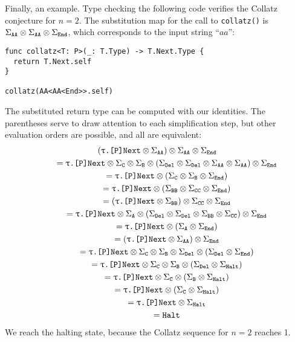 \documentclass[../generics]{subfiles}
\begin{document}
Finally, an example. Type checking the following code verifies the Collatz conjecture for $n=2$. The substitution map for the call to \texttt{collatz()} is $\Sigma_{\texttt{AA}}\otimes\Sigma_{\texttt{AA}}\otimes\Sigma_{\texttt{End}}$, which corresponds to the input string ``$aa$'':
\begin{Verbatim}
func collatz<T: P>(_: T.Type) -> T.Next.Type {
  return T.Next.self
}

collatz(AA<AA<End>>.self)
\end{Verbatim}
The substituted return type can be computed with our identities. The parentheses serve to draw attention to each simplification step, but other evaluation orders are possible, and all are equivalent:
\begin{gather*}
\left(\texttt{$\uptau$.[P]Next}\otimes\Sigma_{\texttt{AA}}\right)\otimes\Sigma_{\texttt{AA}}\otimes\Sigma_{\texttt{End}}\\
\qquad {} = \texttt{$\uptau$.[P]Next} \otimes \Sigma_{\texttt{C}} \otimes \Sigma_{\texttt{B}} \otimes \left(\Sigma_{\texttt{Del}} \otimes \Sigma_{\texttt{Del}} \otimes \Sigma_{\texttt{AA}}\otimes\Sigma_{\texttt{AA}}\right)\otimes\Sigma_{\texttt{End}}\\
\qquad {} = \texttt{$\uptau$.[P]Next} \otimes \left(\Sigma_{\texttt{C}} \otimes \Sigma_{\texttt{B}} \otimes\Sigma_{\texttt{End}}\right)\\
\qquad {} = \texttt{$\uptau$.[P]Next} \otimes \left(\Sigma_{\texttt{BB}} \otimes \Sigma_{\texttt{CC}} \otimes\Sigma_{\texttt{End}}\right)\\
\qquad {} = \left(\texttt{$\uptau$.[P]Next}\otimes\Sigma_{\texttt{BB}}\right)\otimes\Sigma_{\texttt{CC}}\otimes\Sigma_{\texttt{End}}\\
\qquad {} = \texttt{$\uptau$.[P]Next}\otimes\Sigma_{\texttt{A}} \otimes \left(\Sigma_{\texttt{Del}} \otimes \Sigma_{\texttt{Del}} \otimes \Sigma_{\texttt{BB}}\otimes\Sigma_{\texttt{CC}}\right)\otimes\Sigma_{\texttt{End}}\\
\qquad {} = \texttt{$\uptau$.[P]Next}\otimes\left(\Sigma_{\texttt{A}} \otimes \Sigma_{\texttt{End}}\right)\\
\qquad {} = \left(\texttt{$\uptau$.[P]Next}\otimes\Sigma_{\texttt{AA}}\right) \otimes \Sigma_{\texttt{End}}\\
\qquad {} = \texttt{$\uptau$.[P]Next} \otimes \Sigma_{\texttt{C}} \otimes \Sigma_{\texttt{B}} \otimes \Sigma_{\texttt{Del}} \otimes \left( \Sigma_{\texttt{Del}} \otimes \Sigma_{\texttt{End}}\right)\\
\qquad {} = \texttt{$\uptau$.[P]Next} \otimes \Sigma_{\texttt{C}} \otimes \Sigma_{\texttt{B}} \otimes \left(\Sigma_{\texttt{Del}} \otimes \Sigma_{\texttt{Halt}}\right)\\
\qquad {} = \texttt{$\uptau$.[P]Next} \otimes \Sigma_{\texttt{C}} \otimes \left(\Sigma_{\texttt{B}} \otimes \Sigma_{\texttt{Halt}}\right)\\
\qquad {} = \texttt{$\uptau$.[P]Next} \otimes \left(\Sigma_{\texttt{C}} \otimes \Sigma_{\texttt{Halt}}\right)\\
\qquad {} = \texttt{$\uptau$.[P]Next} \otimes \Sigma_{\texttt{Halt}}\\
\qquad {} = \texttt{Halt}
\end{gather*}
We reach the halting state, because the Collatz sequence for $n=2$ reaches 1.
\end{document}
